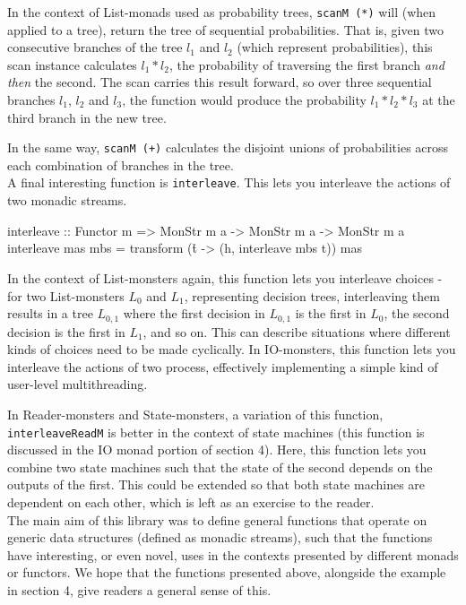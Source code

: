 In the context of List-monads used as probability trees, \verb+scanM (*)+ will (when applied to a tree), return the tree of sequential probabilities. That is, given two consecutive branches of the tree $l_1$ and $l_2$ (which represent probabilities), this scan instance calculates $l_1 * l_2$, the probability of traversing the first branch \emph{and then} the second. The scan carries this result forward, so over three sequential branches $l_1$, $l_2$ and $l_3$, the function would produce the probability $l_1 * l_2 * l_3$ at the third branch in the new tree. 

In the same way, \verb=scanM (+)= calculates the disjoint unions of probabilities across each combination of branches in the tree. \\

A final interesting function is \verb+interleave+. This lets you interleave the actions of two monadic streams. 

\begin{haskell}
interleave :: Functor m =>  MonStr m a -> MonStr m a -> MonStr m a
interleave mas mbs = transform (\h t -> (h, interleave mbs t)) mas
\end{haskell}

In the context of List-monsters again, this function lets you interleave choices - for two List-monsters $L_0$ and $L_1$, representing decision trees, interleaving them results in a tree $L_{0,1}$ where the first decision in $L_{0,1}$ is the first in $L_0$, the second decision is the first in $L_1$, and so on. This can describe situations where different kinds of choices need to be made cyclically. In IO-monsters, this function lets you interleave the actions of two process, effectively implementing a simple kind of user-level multithreading. 

In Reader-monsters and State-monsters, a variation of this function, \newline \verb+interleaveReadM+ is better in the context of state machines (this function is discussed in the IO monad portion of section 4). Here, this function lets you combine two state machines such that the state of the second depends on the outputs of the first. This could be extended so that both state machines are dependent on each other, which is left as an exercise to the reader. \\

The main aim of this library was to define general functions that operate on generic data structures (defined as monadic streams), such that the functions have interesting, or even novel, uses in the contexts presented by different monads or functors. We hope that the functions presented above, alongside the example in section 4, give readers a general sense of this.

